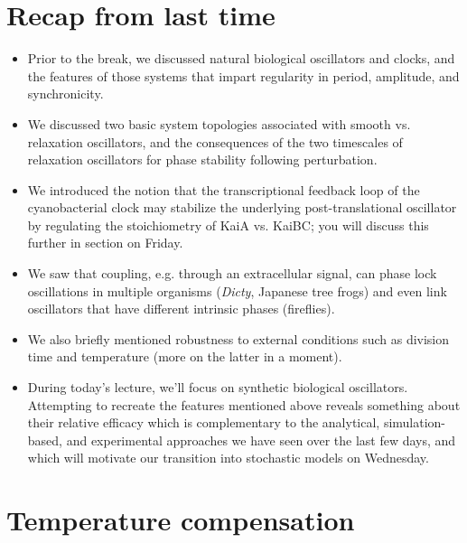 \documentclass{article}
\begin{document}
\large

\section*{Recap from last time}
\begin{itemize}
\item Prior to the break, we discussed natural biological oscillators and clocks, and the features of those systems that impart regularity in period, amplitude, and synchronicity.
\item We discussed two basic system topologies associated with smooth vs. relaxation oscillators, and the consequences of the two timescales of relaxation oscillators for phase stability following perturbation.
\item We introduced the notion that the transcriptional feedback loop of the cyanobacterial clock may stabilize the underlying post-translational oscillator by regulating the stoichiometry of KaiA vs. KaiBC; you will discuss this further in section on Friday.
\item We saw that coupling, e.g. through an extracellular signal, can phase lock oscillations in multiple organisms (\textit{Dicty}, Japanese tree frogs) and even link oscillators that have different intrinsic phases (fireflies).
\item We also briefly mentioned robustness to external conditions such as division time and temperature (more on the latter in a moment).
\item During today's lecture, we'll focus on synthetic biological oscillators. Attempting to recreate the features mentioned above reveals something about their relative efficacy which is complementary to the analytical, simulation-based, and experimental approaches we have seen over the last few days, and which will motivate our transition into stochastic models on Wednesday.
\end{itemize}

\section*{Temperature compensation}
\end{document}

